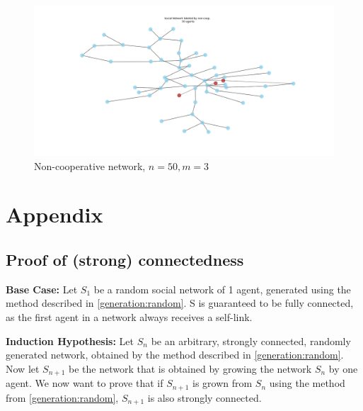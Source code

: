 \documentclass{article}
\begin{document}
\begin{center}
    \begin{figure}[!htbp]
        \centering
        \includegraphics[width=1\textwidth]{ThesisKI/Images/NonCoopGraph.png}
        \caption{Non-cooperative network, $n=50, m=3$}
        \label{network:noncoop}
    \end{figure}
\end{center}


\newpage
\section{Appendix}
\subsection{Proof of (strong) connectedness}
\label{proof:conn}
\textbf{Base Case:} \newline
Let $S_1$ be a random social network of 1 agent, generated using the method described in \ref{generation:random}.
S is guaranteed to be fully connected, as the first agent in a network always receives a self-link.\newline

\textbf{Induction Hypothesis:}\newline
Let $S_n$ be an arbitrary, strongly connected, randomly generated network, obtained by the method described in \ref{generation:random}. Now let $S_{n+1}$ be the network that is obtained by growing the network $S_n$ by one agent. We now want to prove that if $S_{n+1}$ is grown from $S_n$ using the method from \ref{generation:random}, $S_{n+1}$ is also strongly connected.\newline
\end{document}
